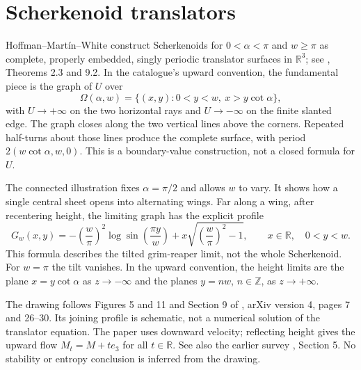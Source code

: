 \chapter{Scherkenoid translators}\label{sec:catalogue-scherkenoids}
\begin{example}\label{ex:catalogue-scherkenoids}
Hoffman--Mart\'in--White construct Scherkenoids for $0<\alpha<\pi$ and $w\geq\pi$ as complete, properly embedded, singly periodic translator surfaces in $\mathbb R^3$; see \cite{CatHMW20}, Theorems 2.3 and 9.2. In the catalogue's upward convention, the fundamental piece is the graph of $U$ over
\[
\Omega(\alpha,w)=\{(x,y):0<y<w,\ x>y\cot\alpha\},
\]
with $U\to+\infty$ on the two horizontal rays and $U\to-\infty$ on the finite slanted edge. The graph closes along the two vertical lines above the corners. Repeated half-turns about those lines produce the complete surface, with period $2(w\cot\alpha,w,0)$. This is a boundary-value construction, not a closed formula for $U$.

The connected illustration fixes $\alpha=\pi/2$ and allows $w$ to vary. It shows how a single central sheet opens into alternating wings. Far along a wing, after recentering height, the limiting graph has the explicit profile
\[
G_w(x,y)=-\left(\frac{w}{\pi}\right)^2\log\sin\left(\frac{\pi y}{w}\right)
+x\sqrt{\left(\frac{w}{\pi}\right)^2-1},\qquad x\in\mathbb R,\quad 0<y<w.
\]
This formula describes the tilted grim-reaper limit, not the whole Scherkenoid. For $w=\pi$ the tilt vanishes. In the upward convention, the height limits are the plane $x=y\cot\alpha$ as $z\to-\infty$ and the planes $y=nw$, $n\in\mathbb Z$, as $z\to+\infty$.

The drawing follows Figures 5 and 11 and Section 9 of \cite{CatHMW20}, arXiv version 4, pages 7 and 26--30. Its joining profile is schematic, not a numerical solution of the translator equation. The paper uses downward velocity; reflecting height gives the upward flow $M_t=M+t e_3$ for all $t\in\mathbb R$. See also the earlier survey \cite{CatHIMWNotes19}, Section 5. No stability or entropy conclusion is inferred from the drawing.
\end{example}


